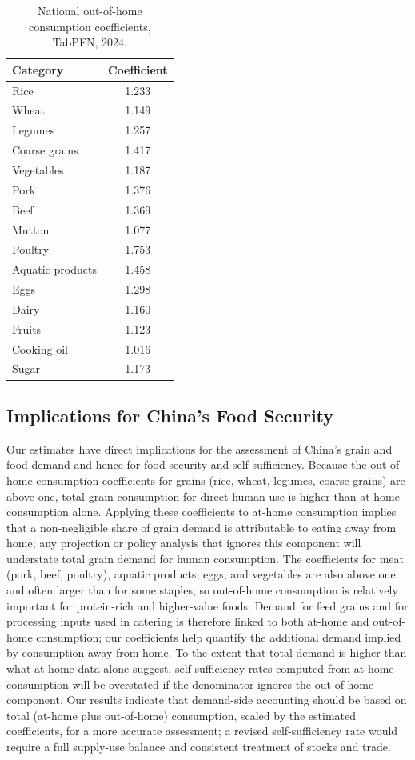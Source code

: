 \documentclass[12pt,a4paper]{article}
\begin{document}
\begin{table}[htbp]
\centering
\caption{National out-of-home consumption coefficients, TabPFN, 2024.}
\label{tab:tabpfn_2024_national}
\begin{tabular}{lc}
\toprule
Category & Coefficient \\
\midrule
Rice & 1.233 \\
Wheat & 1.149 \\
Legumes & 1.257 \\
Coarse grains & 1.417 \\
Vegetables & 1.187 \\
Pork & 1.376 \\
Beef & 1.369 \\
Mutton & 1.077 \\
Poultry & 1.753 \\
Aquatic products & 1.458 \\
Eggs & 1.298 \\
Dairy & 1.160 \\
Fruits & 1.123 \\
Cooking oil & 1.016 \\
Sugar & 1.173 \\
\bottomrule
\end{tabular}
\end{table}

\subsection{Implications for China's Food Security}

Our estimates have direct implications for the assessment of China's grain and food demand and hence for food security and self-sufficiency. Because the out-of-home consumption coefficients for grains (rice, wheat, legumes, coarse grains) are above one, total grain consumption for direct human use is higher than at-home consumption alone. Applying these coefficients to at-home consumption implies that a non-negligible share of grain demand is attributable to eating away from home; any projection or policy analysis that ignores this component will understate total grain demand for human consumption. The coefficients for meat (pork, beef, poultry), aquatic products, eggs, and vegetables are also above one and often larger than for some staples, so out-of-home consumption is relatively important for protein-rich and higher-value foods. Demand for feed grains and for processing inputs used in catering is therefore linked to both at-home and out-of-home consumption; our coefficients help quantify the additional demand implied by consumption away from home. To the extent that total demand is higher than what at-home data alone suggest, self-sufficiency rates computed from at-home consumption will be overstated if the denominator ignores the out-of-home component. Our results indicate that demand-side accounting should be based on total (at-home plus out-of-home) consumption, scaled by the estimated coefficients, for a more accurate assessment; a revised self-sufficiency rate would require a full supply-use balance and consistent treatment of stocks and trade.
\end{document}
